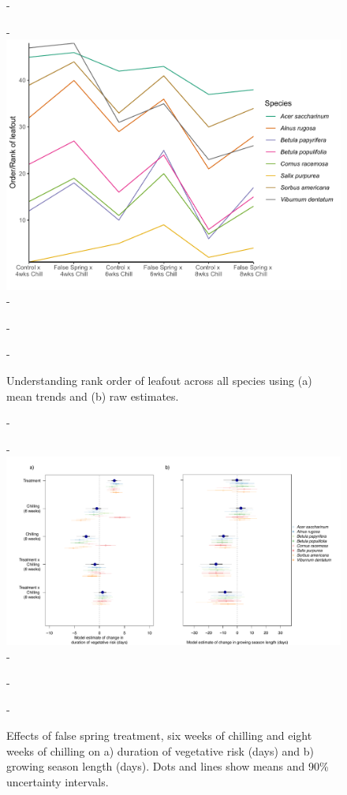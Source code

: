 \documentclass{article}\usepackage[]{graphicx}\usepackage[]{color}
\begin{document}
  {\begin{figure} [H]
  -\begin{center}
  -\includegraphics[width=12cm]{..//analyses/figures/leafoutorder_byrank.pdf} 
  -\caption{Understanding rank order of leafout across all species using (a) mean trends and (b) raw estimates. }\label{fig:rank}
  -\end{center}
  -\end{figure}}
  
  {\begin{figure} [H]
  -\begin{center}
  -\includegraphics[width=18cm]{..//analyses/figures/mu_phen.pdf} 
  -\caption{Effects of false spring treatment, six weeks of chilling and eight weeks of chilling on a) duration of vegetative risk (days) and b) growing season length (days). Dots and lines show means and 90\% uncertainty intervals.}\label{fig:muphen}
  -\end{center}
  -\end{figure}}
  
\end{document}
